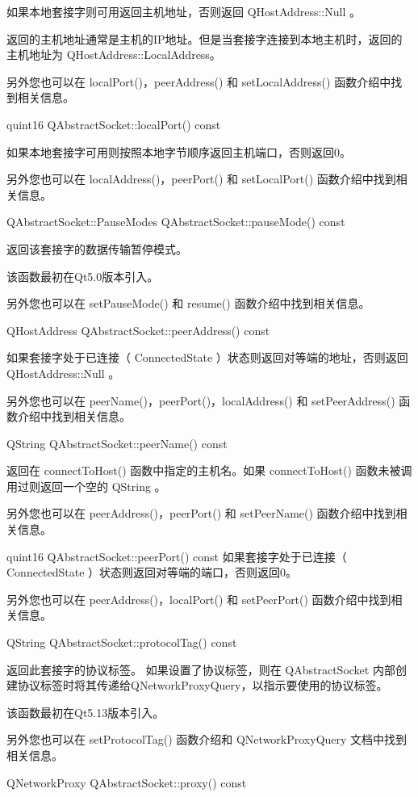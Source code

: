 如果本地套接字则可用返回主机地址，否则返回 QHostAddress::Null 。

返回的主机地址通常是主机的IP地址。但是当套接字连接到本地主机时，返回的主机地址为 QHostAddress::LocalAddress。

另外您也可以在 localPort()，peerAddress() 和 setLocalAddress() 函数介绍中找到相关信息。

quint16 QAbstractSocket::localPort() const

如果本地套接字可用则按照本地字节顺序返回主机端口，否则返回0。

另外您也可以在 localAddress()，peerPort() 和 setLocalPort() 函数介绍中找到相关信息。

QAbstractSocket::PauseModes QAbstractSocket::pauseMode() const

返回该套接字的数据传输暂停模式。

该函数最初在Qt5.0版本引入。

另外您也可以在 setPauseMode() 和 resume() 函数介绍中找到相关信息。

QHostAddress QAbstractSocket::peerAddress() const

如果套接字处于已连接（ ConnectedState ）状态则返回对等端的地址，否则返回 QHostAddress::Null 。

另外您也可以在 peerName()，peerPort()，localAddress() 和 setPeerAddress() 函数介绍中找到相关信息。

QString QAbstractSocket::peerName() const

返回在 connectToHost() 函数中指定的主机名。如果 connectToHost() 函数未被调用过则返回一个空的 QString 。

另外您也可以在 peerAddress()，peerPort() 和 setPeerName() 函数介绍中找到相关信息。

quint16 QAbstractSocket::peerPort() const
如果套接字处于已连接（ ConnectedState ）状态则返回对等端的端口，否则返回0。

另外您也可以在 peerAddress()，localPort() 和 setPeerPort() 函数介绍中找到相关信息。

QString QAbstractSocket::protocolTag() const

返回此套接字的协议标签。 如果设置了协议标签，则在 QAbstractSocket 内部创建协议标签时将其传递给QNetworkProxyQuery，以指示要使用的协议标签。

该函数最初在Qt5.13版本引入。

另外您也可以在 setProtocolTag() 函数介绍和 QNetworkProxyQuery 文档中找到相关信息。

QNetworkProxy QAbstractSocket::proxy() const

